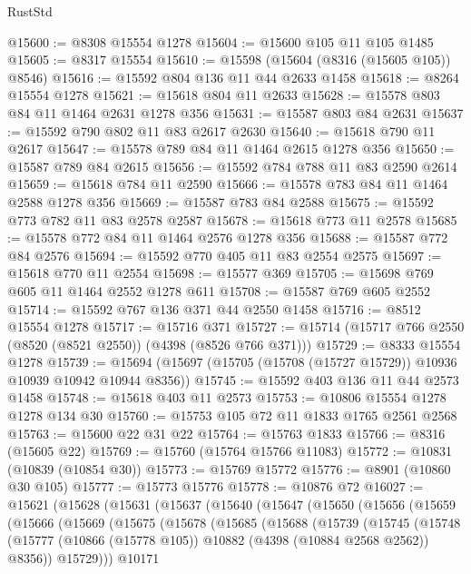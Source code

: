 \begin{lexlean}{RustStd}
\begin{coremodule}
@15600 := @8308 @15554 @1278
@15604 := @15600 @105 @11 @105 @1485
@15605 := @8317 @15554
@15610 := @15598 (@15604 (@8316 (@15605 @105)) @8546)
@15616 := @15592 @804 @136 @11 @44 @2633 @1458
@15618 := @8264 @15554 @1278
@15621 := @15618 @804 @11 @2633
@15628 := @15578 @803 @84 @11 @1464 @2631 @1278 @356
@15631 := @15587 @803 @84 @2631
@15637 := @15592 @790 @802 @11 @83 @2617 @2630
@15640 := @15618 @790 @11 @2617
@15647 := @15578 @789 @84 @11 @1464 @2615 @1278 @356
@15650 := @15587 @789 @84 @2615
@15656 := @15592 @784 @788 @11 @83 @2590 @2614
@15659 := @15618 @784 @11 @2590
@15666 := @15578 @783 @84 @11 @1464 @2588 @1278 @356
@15669 := @15587 @783 @84 @2588
@15675 := @15592 @773 @782 @11 @83 @2578 @2587
@15678 := @15618 @773 @11 @2578
@15685 := @15578 @772 @84 @11 @1464 @2576 @1278 @356
@15688 := @15587 @772 @84 @2576
@15694 := @15592 @770 @405 @11 @83 @2554 @2575
@15697 := @15618 @770 @11 @2554
@15698 := @15577 @369
@15705 := @15698 @769 @605 @11 @1464 @2552 @1278 @611
@15708 := @15587 @769 @605 @2552
@15714 := @15592 @767 @136 @371 @44 @2550 @1458
@15716 := @8512 @15554 @1278
@15717 := @15716 @371
@15727 := @15714 (@15717 @766 @2550 (@8520 (@8521 @2550)) (@4398 (@8526 @766 @371)))
@15729 := @8333 @15554 @1278
@15739 := @15694 (@15697 (@15705 (@15708 (@15727 @15729)) @10936 @10939 @10942 @10944 @8356))
@15745 := @15592 @403 @136 @11 @44 @2573 @1458
@15748 := @15618 @403 @11 @2573
@15753 := @10806 @15554 @1278 @1278 @134 @30
@15760 := @15753 @105 @72 @11 @1833 @1765 @2561 @2568
@15763 := @15600 @22 @31 @22
@15764 := @15763 @1833
@15766 := @8316 (@15605 @22)
@15769 := @15760 (@15764 @15766 @11083)
@15772 := @10831 (@10839 (@10854 @30))
@15773 := @15769 @15772
@15776 := @8901 (@10860 @30 @105)
@15777 := @15773 @15776
@15778 := @10876 @72
@16027 := @15621
    (@15628
      (@15631
        (@15637
          (@15640
            (@15647
              (@15650
                (@15656
                  (@15659
                    (@15666
                      (@15669
                        (@15675
                          (@15678
                            (@15685
                              (@15688
                                (@15739
                                  (@15745
                                    (@15748
                                      (@15777
                                        (@10866 (@15778 @105))
                                        @10882
                                        (@4398 (@10884 @2568 @2562))
                                        @8356))
                                    @15729)))
                              @10171

\end{coremodule}
\end{lexlean}

